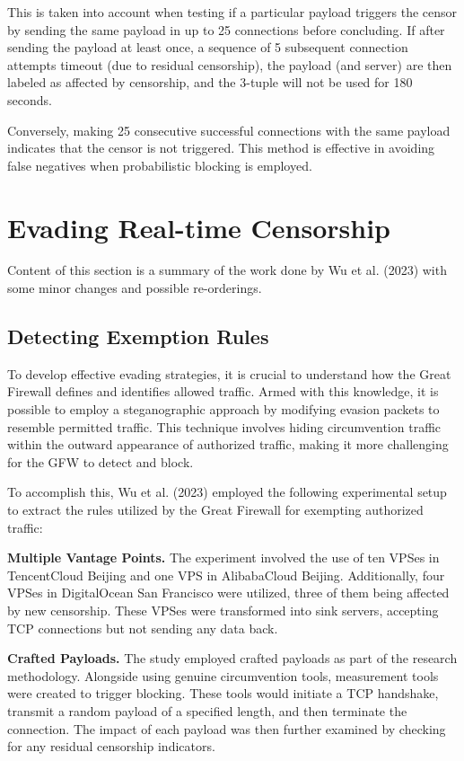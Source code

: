 This is taken into account when testing if a particular payload triggers the censor by sending the same payload in up to 25 connections before concluding. If after sending the payload at least once, a sequence of 5 subsequent connection attempts timeout (due to residual censorship), the payload (and server) are then labeled as affected by censorship, and the 3-tuple will not be used for 180 seconds. 

Conversely, making 25 consecutive successful connections with the same payload indicates that the censor is not triggered. This method is effective in avoiding false negatives when probabilistic blocking is employed.\cite{wu2023great}

\section{Evading Real-time Censorship}
Content of this section is a summary of the work done by Wu et al. (2023) with some minor changes and possible re-orderings.\cite{wu2023great}

\subsection{Detecting Exemption Rules}
To develop effective evading strategies, it is crucial to understand how the Great Firewall defines and identifies allowed traffic. Armed with this knowledge, it is possible to employ a steganographic approach by modifying evasion packets to resemble permitted traffic. This technique involves hiding circumvention traffic within the outward appearance of authorized traffic, making it more challenging for the GFW to detect and block. 

To accomplish this, Wu et al. (2023) employed the following experimental setup to extract the rules utilized by the Great Firewall for exempting authorized traffic:

\textbf{Multiple Vantage Points.} The experiment involved the use of ten VPSes in TencentCloud Beijing and one VPS in AlibabaCloud Beijing. Additionally, four VPSes in DigitalOcean San Francisco were utilized, three of them being affected by new censorship. These VPSes were transformed into sink servers, accepting TCP connections but not sending any data back.

\textbf{Crafted Payloads.} The study employed crafted payloads as part of the research methodology. Alongside using genuine circumvention tools, measurement tools were created to trigger blocking. These tools would initiate a TCP handshake, transmit a random payload of a specified length, and then terminate the connection. The impact of each payload was then further examined by checking for any residual censorship indicators.

